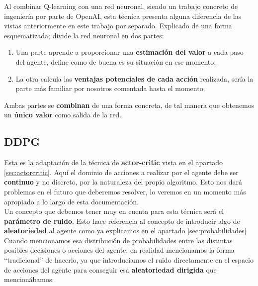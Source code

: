 \documentclass[11pt,fleqn]{book} %
\begin{document}
Al combinar Q-learning con una red neuronal, siendo un trabajo concreto de ingeniería por parte de OpenAI, esta técnica presenta alguna diferencia de las vistas anteriormente en este trabajo por separado. Explicado de una forma esquematizada; divide la red neuronal en dos partes: \\

\begin{enumerate}
	\item Una parte aprende a proporcionar una \textbf{estimación del valor} a cada paso del agente, define como de buena es su situación en ese momento. \\
	
	\item La otra calcula las \textbf{ventajas potenciales de cada acción} realizada, sería la parte más familiar por nosotros comentada hasta el momento. \\
	
\end{enumerate}

Ambas partes se \textbf{combinan} de una forma concreta, de tal manera que obtenemos un \textbf{único valor} como salida de la red. \cite{article:DQN}

\subsection{DDPG}\label{sec:DDPG}

Esta es la adaptación de la técnica de \textbf{actor-critic} vista en el apartado \ref{sec:actorcritic}. Aquí el dominio de acciones a realizar por el agente debe ser \textbf{continuo} y no discreto, por la naturaleza del propio algoritmo. Esto nos dará problemas en el futuro que deberemos resolver, lo veremos en un momento más apropiado a lo largo de esta documentación. \\

Un concepto que debemos tener muy en cuenta para esta técnica será el \textbf{parámetro de ruido}. Esto hace referencia al concepto de introducir algo de \textbf{aleatoriedad} al agente como ya explicamos en el apartado \ref{sec:probabilidades} \\

Cuando mencionamos esa distribución de probabilidades entre las distintas posibles decisiones o acciones del agente, en realidad mencionamos la forma ``tradicional'' de hacerlo, ya que introducíamos el ruido directamente en el espacio de acciones del agente para conseguir esa \textbf{aleatoriedad dirigida} que mencionábamos. \\
\end{document}
